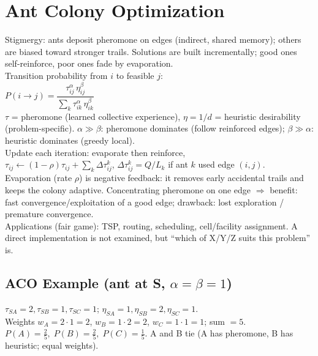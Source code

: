 \section{Ant Colony Optimization}
Stigmergy: ants deposit pheromone on edges (indirect, shared memory); others are biased toward stronger trails. Solutions are built incrementally; good ones self-reinforce, poor ones fade by evaporation.\\
Transition probability from \(i\) to feasible \(j\):\\
\(P(i\!\to\!j)=\dfrac{\tau_{ij}^{\alpha}\,\eta_{ij}^{\beta}}{\sum_{k}\tau_{ik}^{\alpha}\,\eta_{ik}^{\beta}}\)\\
\(\tau\) = pheromone (learned collective experience), \(\eta=1/d\) = heuristic desirability (problem-specific). \(\alpha\!\gg\!\beta\): pheromone dominates (follow reinforced edges); \(\beta\!\gg\!\alpha\): heuristic dominates (greedy local).\\
Update each iteration: evaporate then reinforce,\\
\(\tau_{ij}\leftarrow(1-\rho)\tau_{ij}+\sum_k\Delta\tau_{ij}^{k}\), \(\Delta\tau_{ij}^{k}=Q/L_k\) if ant \(k\) used edge \((i,j)\).\\
Evaporation (rate \(\rho\)) is negative feedback: it removes early accidental trails and keeps the colony adaptive. Concentrating pheromone on one edge \(\Rightarrow\) benefit: fast convergence/exploitation of a good edge; drawback: lost exploration / premature convergence.\\
Applications (fair game): TSP, routing, scheduling, cell/facility assignment. A direct implementation is not examined, but ``which of X/Y/Z suits this problem'' is.

\subsection*{ACO Example (ant at S, \(\alpha{=}\beta{=}1\))}
\(\tau_{SA}{=}2,\tau_{SB}{=}1,\tau_{SC}{=}1\); \(\eta_{SA}{=}1,\eta_{SB}{=}2,\eta_{SC}{=}1\).\\
Weights \(w_A=2\!\cdot\!1=2\), \(w_B=1\!\cdot\!2=2\), \(w_C=1\!\cdot\!1=1\); sum \(=5\).\\
\(P(A)=\tfrac25,\;P(B)=\tfrac25,\;P(C)=\tfrac15\). A and B tie (A has pheromone, B has heuristic; equal weights).


